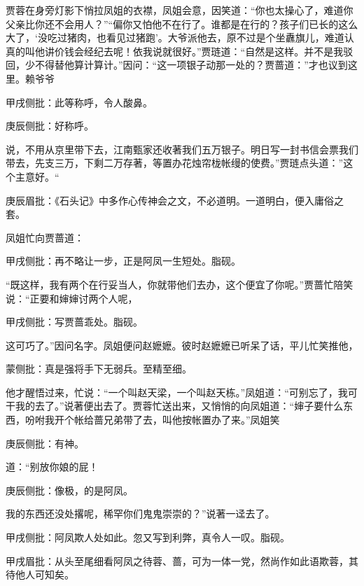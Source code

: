 \begin{parag}


    贾蓉在身旁灯影下悄拉凤姐的衣襟，凤姐会意，因笑道：“你也太操心了，难道你父亲比你还不会用人？”“偏你又怕他不在行了。谁都是在行的？孩子们已长的这么大了，‘没吃过猪肉，也看见过猪跑’。大爷派他去，原不过是个坐纛旗儿，难道认真的叫他讲价钱会经纪去呢！依我说就很好。”贾琏道：“自然是这样。并不是我驳回，少不得替他算计算计。”因问：“这一项银子动那一处的？贾蔷道：”才也议到这里。赖爷爷\begin{note}甲戌侧批：此等称呼，令人酸鼻。\end{note}\begin{note}庚辰侧批：好称呼。\end{note}说，不用从京里带下去，江南甄家还收著我们五万银子。明日写一封书信会票我们带去，先支三万，下剩二万存著，等置办花烛帘栊帐缦的使费。”贾琏点头道：”这个主意好。“\begin{note}庚辰眉批：《石头记》中多作心传神会之文，不必道明。一道明白，便入庸俗之套。\end{note}
\end{parag}


\begin{parag}


    凤姐忙向贾蔷道：\begin{note}甲戌侧批：再不略让一步，正是阿凤一生短处。脂砚。\end{note}“既这样，我有两个在行妥当人，你就带他们去办，这个便宜了你呢。”贾蔷忙陪笑说：“正要和婶婶讨两个人呢，\begin{note}甲戌侧批：写贾蔷乖处。脂砚。\end{note}这可巧了。”因问名字。凤姐便问赵嬷嬷。彼时赵嬷嬷已听呆了话，平儿忙笑推他，\begin{note}蒙侧批：真是强将手下无弱兵。至精至细。\end{note}他才醒悟过来，忙说：“一个叫赵天梁，一个叫赵天栋。”凤姐道：“可别忘了，我可干我的去了。”说著便出去了。贾蓉忙送出来，又悄悄的向凤姐道：“婶子要什么东西，吩咐我开个帐给蔷兄弟带了去，叫他按帐置办了来。”凤姐笑\begin{note}庚辰侧批：有神。\end{note}道：“别放你娘的屁！\begin{note}庚辰侧批：像极，的是阿凤。\end{note}我的东西还没处撂呢，稀罕你们鬼鬼崇崇的？”说著一迳去了。\begin{note}甲戌侧批：阿凤欺人处如此。忽又写到利弊，真令人一叹。脂砚。\end{note}\begin{note}甲戌眉批：从头至尾细看阿凤之待蓉、蔷，可为一体一党，然尚作如此语欺蓉，其待他人可知矣。\end{note}
\end{parag}


